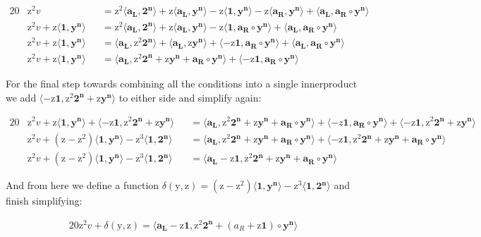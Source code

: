 \documentclass{article}
\newcommand{\eq}[1]{\begin{alignat*}{20}#1\end{alignat*}}
\renewcommand{\vec}[1]{\boldsymbol{#1}}
\newcommand{\ran}[1]{\mathrm{#1}}
\newcommand{\vecran}[1]{\mathbf{#1}}
\newcommand{\dotp}[2]{\langle #1, #2 \rangle}
\begin{document}
\eq{	
	&\ran{z^2}v &&= 
	\ran{z^2}\dotp{\vec{a_L}}{\vec{2^n}} +
	\ran{z}\dotp{\vec{a_L}}{\vecran{y^n}} -
	\ran{z}\dotp{\vec{1}}{\vecran{y^n}} -
	\ran{z}\dotp{\vec{a_R}}{\vecran{y^n}} +
	\dotp{\vec{a_L}}{\vec{a_R}\circ \vecran{y^n}} \\
	&\ran{z^2}v + \ran{z}\dotp{\vec{1}}{\vecran{y^n}} 
	&&= \ran{z^2}\dotp{\vec{a_L}}{\vec{2^n}} +
	\ran{z}\dotp{\vec{a_L}}{\vecran{y^n}} -
	\ran{z}\dotp{\vec{1}}{\vec{a_R}\circ\vecran{y^n}} +
	\dotp{\vec{a_L}}{\vec{a_R}\circ \vecran{y^n}} \\
	&\ran{z^2}v + \ran{z}\dotp{\vec{1}}{\vecran{y^n}} 
	&&= \dotp{\vec{a_L}}{\ran{z^2}\vec{2^n}} +
	\dotp{\vec{a_L}}{\ran{z}\vecran{y^n}} +
	\dotp{-\ran{z}\vec{1}}{\vec{a_R}\circ\vecran{y^n}} +
	\dotp{\vec{a_L}}{\vec{a_R}\circ \vecran{y^n}} \\
	&\ran{z^2}v + \ran{z}\dotp{\vec{1}}{\vecran{y^n}} 
	&&= \dotp{\vec{a_L}}{\ran{z^2}\vec{2^n} + \ran{z}\vecran{y^n} + \vec{a_R}\circ \vecran{y^n}} +
	\dotp{-\ran{z}\vec{1}}{\vec{a_R}\circ\vecran{y^n}}
}

For the final step towards combining all the conditions into a single innerproduct we add $\dotp{-\ran{z}\vec{1}}{\ran{z^2}\vec{2^n} + \ran{z}\vecran{y^n}}$ to either side and simplify again:

\eq{
	&\ran{z^2}v + \ran{z}\dotp{\vec{1}}{\vecran{y^n}} + \dotp{-\ran{z}\vec{1}}{\ran{z^2}\vec{2^n} + \ran{z}\vecran{y^n}}
	&&= \dotp{\vec{a_L}}{\ran{z^2}\vec{2^n} + \ran{z}\vecran{y^n} + \vec{a_R}\circ \vecran{y^n}} +
	\dotp{-z\vec{1}}{\vec{a_R}\circ\vecran{y^n}} + \dotp{-\ran{z}\vec{1}}{\ran{z^2}\vec{2^n} + \ran{z}\vecran{y^n}} \\ 
	&\ran{z^2}v + (\ran{z} - \ran{z^2})\dotp{\vec{1}}{\vecran{y^n}} - \ran{z^3}\dotp{\vec{1}}{\vec{2^n}} &&= \dotp{\vec{a_L}}{\ran{z^2}\vec{2^n} + \ran{z}\vecran{y^n} + \vec{a_R}\circ \vecran{y^n}} + \dotp{-\ran{z}\vec{1}}{\ran{z^2}\vec{2^n}+\ran{z}\vecran{y^n} + \vec{a_R}\circ\vecran{y^n}}
	\\
	&\ran{z^2}v + (\ran{z} - \ran{z^2})\dotp{\vec{1}}{\vecran{y^n}} - \ran{z^3}\dotp{\vec{1}}{\vec{2^n}} &&= \dotp{\vec{a_L}- \ran{z}\vec{1}}{\ran{z^2}\vec{2^n} + \ran{z}\vecran{y^n} + \vec{a_R}\circ \vecran{y^n}}
}

And from here we define a function $\delta(\ran{y},\ran{z}) = (\ran{z} - \ran{z^2})\dotp{\vec{1}}{\vecran{y^n}} - \ran{z^3}\dotp{\vec{1}}{\vec{2^n}}$ and finish simplifying:

\eq{
	\ran{z^2}v + \delta(\ran{y},\ran{z}) = \dotp{\vec{a_L}- \ran{z}\vec{1}}{\ran{z^2}\vec{2^n} + (a_R + \ran{z}\vec{1})\circ\vecran{y^n}}
}
\end{document}
